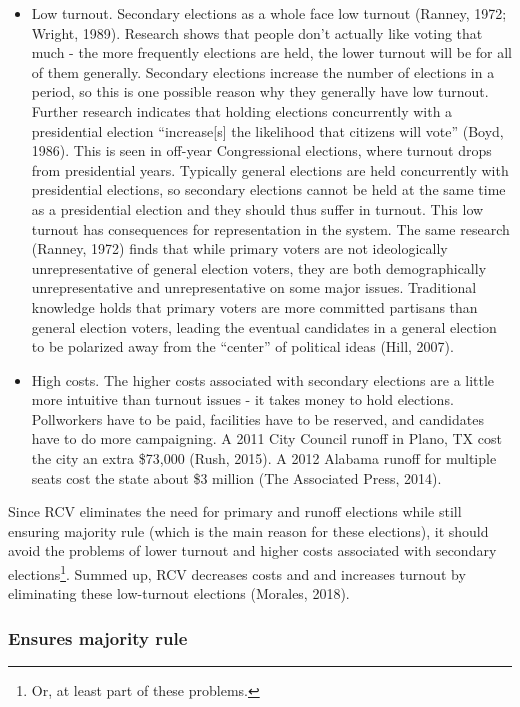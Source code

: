 \documentclass[12pt,twoside]{reedthesis}
\begin{document}
\begin{itemize}
\item
  Low turnout. Secondary elections as a whole face low turnout (Ranney, 1972; Wright, 1989). Research shows that people don't actually like voting that much - the more frequently elections are held, the lower turnout will be for all of them generally. Secondary elections increase the number of elections in a period, so this is one possible reason why they generally have low turnout. Further research indicates that holding elections concurrently with a presidential election ``increase{[}s{]} the likelihood that citizens will vote'' (Boyd, 1986). This is seen in off-year Congressional elections, where turnout drops from presidential years. Typically general elections are held concurrently with presidential elections, so secondary elections cannot be held at the same time as a presidential election and they should thus suffer in turnout. This low turnout has consequences for representation in the system. The same research (Ranney, 1972) finds that while primary voters are not ideologically unrepresentative of general election voters, they are both demographically unrepresentative and unrepresentative on some major issues. Traditional knowledge holds that primary voters are more committed partisans than general election voters, leading the eventual candidates in a general election to be polarized away from the ``center'' of political ideas (Hill, 2007).
\item
  High costs. The higher costs associated with secondary elections are a little more intuitive than turnout issues - it takes money to hold elections. Pollworkers have to be paid, facilities have to be reserved, and candidates have to do more campaigning. A 2011 City Council runoff in Plano, TX cost the city an extra \$73,000 (Rush, 2015). A 2012 Alabama runoff for multiple seats cost the state about \$3 million (The Associated Press, 2014).
\end{itemize}
Since RCV eliminates the need for primary and runoff elections while still ensuring majority rule (which is the main reason for these elections), it should avoid the problems of lower turnout and higher costs associated with secondary elections\footnote{Or, at least part of these problems.}. Summed up, RCV decreases costs and and increases turnout by eliminating these low-turnout elections (Morales, 2018).

\hypertarget{ensures-majority-rule}{%
\subsubsection{Ensures majority rule}\label{ensures-majority-rule}}
\end{document}
